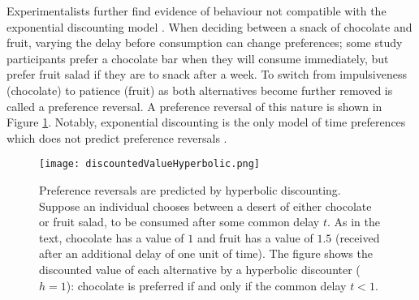 \documentclass[titlepage, hidelinks, 12pt]{article}
\theoremstyle{plain}
\theoremstyle{remark}
\theoremstyle{definition}
\DeclareMathOperator{\hyp}{hyp}
\begin{document}
Experimentalists further find evidence of behaviour not compatible with the exponential discounting model \cite{read98}. 
When deciding between a snack of chocolate and fruit, varying the delay before consumption can change preferences;
some study participants prefer a chocolate bar
when they will consume immediately, but prefer fruit salad if they are to snack after a week. To switch from impulsiveness (chocolate) to patience
(fruit) as
both alternatives become further removed is called a preference reversal. A preference reversal of this nature is shown in Figure 
\ref{fig:discountedValueHyperbolic}.
Notably, exponential discounting is the only model of time preferences which does not predict preference reversals
\cite{strotz55}. 




\begin{figure}[H]
    \centering
    \texttt{[image: discountedValueHyperbolic.png]}
    \caption[Graphical depiction of a preference reversal.]{Preference reversals are predicted by hyperbolic discounting. Suppose an individual
        chooses between a desert of either chocolate
        or fruit salad, to be consumed after some common delay $t$. As in the text,
        chocolate has a value of $1$ and fruit has a value of $1.5$ (received after an additional delay of one unit of time). 
        The figure shows the discounted value
        of each alternative by a hyperbolic discounter ($h = 1$): chocolate is preferred if and only if the common delay $t < 1$. }
    \label{fig:discountedValueHyperbolic}
\end{figure}


%        
\end{document}
